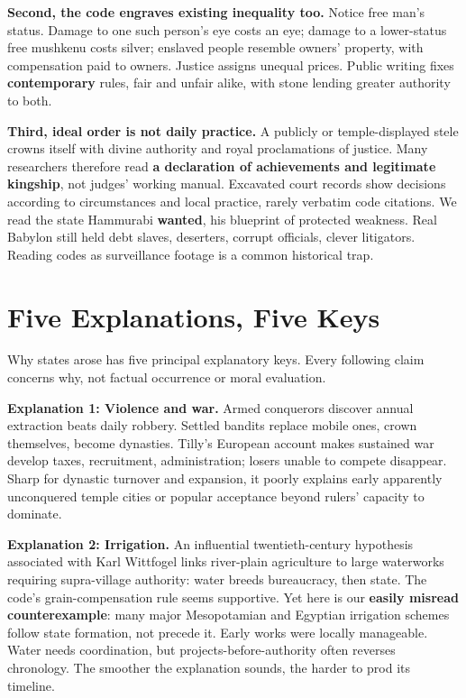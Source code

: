 \textbf{Second, the code engraves existing inequality too.} Notice free man's status. Damage to one such person's eye costs an eye; damage to a lower-status free mushkenu costs silver; enslaved people resemble owners' property, with compensation paid to owners. Justice assigns unequal prices. Public writing fixes \textbf{contemporary} rules, fair and unfair alike, with stone lending greater authority to both.

\textbf{Third, ideal order is not daily practice.} A publicly or temple-displayed stele crowns itself with divine authority and royal proclamations of justice. Many researchers therefore read \textbf{a declaration of achievements and legitimate kingship}, not judges' working manual. Excavated court records show decisions according to circumstances and local practice, rarely verbatim code citations. We read the state Hammurabi \textbf{wanted}, his blueprint of protected weakness. Real Babylon still held debt slaves, deserters, corrupt officials, clever litigators. Reading codes as surveillance footage is a common historical trap.

\section{Five Explanations, Five Keys}
Why states arose has five principal explanatory keys. Every following claim concerns why, not factual occurrence or moral evaluation.

\textbf{Explanation 1: Violence and war.} Armed conquerors discover annual extraction beats daily robbery. Settled bandits replace mobile ones, crown themselves, become dynasties. Tilly's European account makes sustained war develop taxes, recruitment, administration; losers unable to compete disappear. Sharp for dynastic turnover and expansion, it poorly explains early apparently unconquered temple cities or popular acceptance beyond rulers' capacity to dominate.

\textbf{Explanation 2: Irrigation.} An influential twentieth-century hypothesis associated with Karl Wittfogel links river-plain agriculture to large waterworks requiring supra-village authority: water breeds bureaucracy, then state. The code's grain-compensation rule seems supportive. Yet here is our \textbf{easily misread counterexample}: many major Mesopotamian and Egyptian irrigation schemes follow state formation, not precede it. Early works were locally manageable. Water needs coordination, but projects-before-authority often reverses chronology. The smoother the explanation sounds, the harder to prod its timeline.

